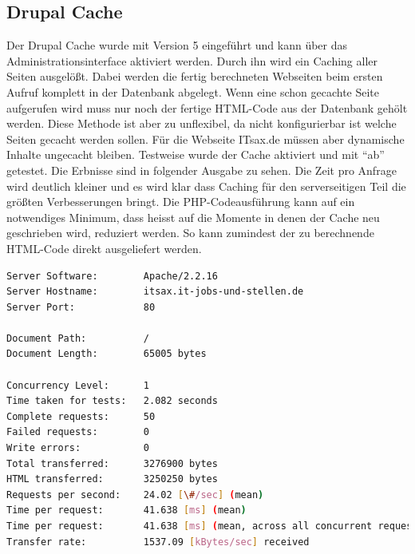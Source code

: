 \subsection{Drupal Cache}Der Drupal Cache wurde mit Version 5 eingef\"uhrt und kann \"uber das Administrationsinterface aktiviert werden. Durch ihn wird ein Caching aller Seiten ausgel\"o\ss{}t. Dabei werden die fertig berechneten Webseiten beim ersten Aufruf komplett in der Datenbank abgelegt. Wenn eine schon gecachte Seite aufgerufen wird muss nur noch der fertige HTML-Code aus der Datenbank geh\"olt werden. Diese Methode ist aber zu unflexibel, da nicht konfigurierbar ist welche Seiten gecacht werden sollen. F\"ur die Webseite ITsax.de m\"ussen aber dynamische Inhalte ungecacht bleiben. Testweise wurde der Cache aktiviert und mit "`ab"' getestet. Die Erbnisse sind in folgender Ausgabe zu sehen. Die Zeit pro Anfrage wird deutlich kleiner und es wird klar dass Caching f\"ur den serverseitigen Teil die gr\"o\ss{}ten Verbesserungen bringt. Die PHP-Codeausführung kann auf ein notwendiges Minimum, dass heisst auf die Momente in denen der Cache neu geschrieben wird, reduziert werden. So kann zumindest der zu berechnende HTML-Code direkt ausgeliefert werden.
\begin{lstlisting}[language=bash,label=Ausgabe von ab,caption=Ausgabe von ab]
Server Software:        Apache/2.2.16
Server Hostname:        itsax.it-jobs-und-stellen.de
Server Port:            80

Document Path:          /
Document Length:        65005 bytes

Concurrency Level:      1
Time taken for tests:   2.082 seconds
Complete requests:      50
Failed requests:        0
Write errors:           0
Total transferred:      3276900 bytes
HTML transferred:       3250250 bytes
Requests per second:    24.02 [\#/sec] (mean)
Time per request:       41.638 [ms] (mean)
Time per request:       41.638 [ms] (mean, across all concurrent requests)
Transfer rate:          1537.09 [kBytes/sec] received
\end{lstlisting}

